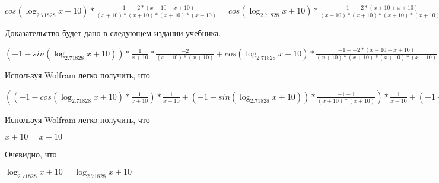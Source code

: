 \documentclass[12pt,a4paper,fleqn]{article}
\theoremstyle{definition}
\begin{document}
$cos(\log_{ 2.71828 }{ x  +  10 }) * \frac{ -1  -  -2  * ( x  +  10  +  x  +  10 )}{( x  +  10 ) * ( x  +  10 ) * ( x  +  10 ) * ( x  +  10 )}
 = cos(\log_{ 2.71828 }{ x  +  10 }) * \frac{ -1  -  -2  * ( x  +  10  +  x  +  10 )}{( x  +  10 ) * ( x  +  10 ) * ( x  +  10 ) * ( x  +  10 )}
$

Доказательство будет дано в следующем издании учебника.

$( -1  - sin(\log_{ 2.71828 }{ x  +  10 })) * \frac{ 1 }{ x  +  10 }
 * \frac{ -2 }{( x  +  10 ) * ( x  +  10 )}
 + cos(\log_{ 2.71828 }{ x  +  10 }) * \frac{ -1  -  -2  * ( x  +  10  +  x  +  10 )}{( x  +  10 ) * ( x  +  10 ) * ( x  +  10 ) * ( x  +  10 )}
 = ( -1  - sin(\log_{ 2.71828 }{ x  +  10 })) * \frac{ 1 }{ x  +  10 }
 * \frac{ -2 }{( x  +  10 ) * ( x  +  10 )}
 + cos(\log_{ 2.71828 }{ x  +  10 }) * \frac{ -1  -  -2  * ( x  +  10  +  x  +  10 )}{( x  +  10 ) * ( x  +  10 ) * ( x  +  10 ) * ( x  +  10 )}
$

Используя Wolfram легко получить, что

$(( -1  - cos(\log_{ 2.71828 }{ x  +  10 }) * \frac{ 1 }{ x  +  10 }
) * \frac{ 1 }{ x  +  10 }
 + ( -1  - sin(\log_{ 2.71828 }{ x  +  10 })) * \frac{ -1  -  1 }{( x  +  10 ) * ( x  +  10 )}
) * \frac{ 1 }{ x  +  10 }
 + ( -1  - sin(\log_{ 2.71828 }{ x  +  10 })) * \frac{ 1 }{ x  +  10 }
 * \frac{ -1  -  1 }{( x  +  10 ) * ( x  +  10 )}
 + ( -1  - sin(\log_{ 2.71828 }{ x  +  10 })) * \frac{ 1 }{ x  +  10 }
 * \frac{ -2 }{( x  +  10 ) * ( x  +  10 )}
 + cos(\log_{ 2.71828 }{ x  +  10 }) * \frac{ -1  -  -2  * ( x  +  10  +  x  +  10 )}{( x  +  10 ) * ( x  +  10 ) * ( x  +  10 ) * ( x  +  10 )}
 = (( -1  - cos(\log_{ 2.71828 }{ x  +  10 }) * \frac{ 1 }{ x  +  10 }
) * \frac{ 1 }{ x  +  10 }
 + ( -1  - sin(\log_{ 2.71828 }{ x  +  10 })) * \frac{ -1  -  1 }{( x  +  10 ) * ( x  +  10 )}
) * \frac{ 1 }{ x  +  10 }
 + ( -1  - sin(\log_{ 2.71828 }{ x  +  10 })) * \frac{ 1 }{ x  +  10 }
 * \frac{ -1  -  1 }{( x  +  10 ) * ( x  +  10 )}
 + ( -1  - sin(\log_{ 2.71828 }{ x  +  10 })) * \frac{ 1 }{ x  +  10 }
 * \frac{ -2 }{( x  +  10 ) * ( x  +  10 )}
 + cos(\log_{ 2.71828 }{ x  +  10 }) * \frac{ -1  -  -2  * ( x  +  10  +  x  +  10 )}{( x  +  10 ) * ( x  +  10 ) * ( x  +  10 ) * ( x  +  10 )}
$

Используя Wolfram легко получить, что

$ x  +  10  =  x  +  10 $

Очевидно, что

$\log_{ 2.71828 }{ x  +  10 } = \log_{ 2.71828 }{ x  +  10 }$
\end{document}
